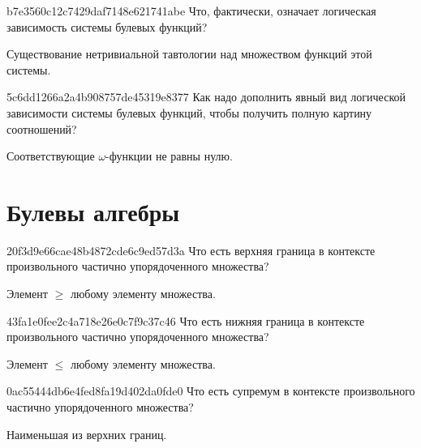 \begin{note}{b7e3560c12c7429daf7148e621741abe}
    Что, фактически, означает логическая зависимость системы булевых функций?

    \begin{cloze}{1}
        Существование нетривиальной тавтологии над множеством функций этой системы.
    \end{cloze}
\end{note}

\begin{note}{5c6dd1266a2a4b908757de45319e8377}
    Как надо дополнить явный вид логической зависимости системы булевых функций, чтобы получить полную картину соотношений?

    \begin{cloze}{1}
        Соответствующие \({ \omega }\)-функции не равны нулю.
    \end{cloze}
\end{note}

\section{Булевы алгебры}
\begin{note}{20f3d9e66cae48b4872cde6c9ed57d3a}
    Что есть верхняя граница в контексте произвольного частично упорядоченного множества?

    \begin{cloze}{1}
        Элемент \({ \geqslant }\) любому элементу множества.
    \end{cloze}
\end{note}

\begin{note}{43fa1e0fee2c4a718e26e0c7f9c37c46}
    Что есть нижняя граница в контексте произвольного частично упорядоченного множества?

    \begin{cloze}{1}
        Элемент \({ \leqslant }\) любому элементу множества.
    \end{cloze}
\end{note}

\begin{note}{0ac55444db6e4fed8fa19d402da0fde0}
    Что есть супремум в контексте произвольного частично упорядоченного множества?

    \begin{cloze}{1}
        Наименьшая из верхних границ.
    \end{cloze}
\end{note}

